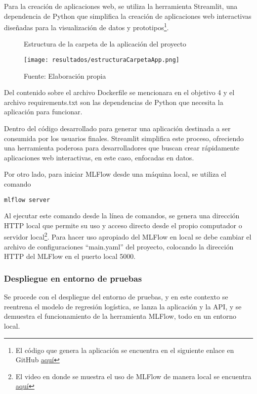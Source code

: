 Para la creación de aplicaciones web, se utiliza la herramienta Streamlit, una dependencia de Python que simplifica la creación de aplicaciones web interactivas diseñadas para la visualización de datos y prototipos\footnote{El código que genera la aplicación se encuentra en el siguiente enlace en GitHub \href{https://github.com/juferoto/mlops_project/tree/master/application/src/webapp}{aquí}}.

\newpage

\begin{figure}[h]
\centering
\caption{Estructura de la carpeta de la aplicación del proyecto}
\texttt{[image: resultados/estructuraCarpetaApp.png]}
\caption*{\footnotesize Fuente: Elaboración propia}
\label{fig:figuraEstructuraCarpetaApp}
\end{figure}

Del contenido sobre el archivo Dockerfile se mencionara en el objetivo 4 y el archivo requirements.txt son las dependencias de Python que necesita la aplicación para funcionar.

Dentro del código desarrollado para generar una aplicación destinada a ser consumida por los usuarios finales. Streamlit simplifica este proceso, ofreciendo una herramienta poderosa para desarrolladores que buscan crear rápidamente aplicaciones web interactivas, en este caso, enfocadas en datos. \newline

Por otro lado, para iniciar MLFlow desde una máquina local, se utiliza el comando 
\begin{verbatim}
mlflow server
\end{verbatim}

Al ejecutar este comando desde la línea de comandos, se genera una dirección HTTP local que permite su uso y acceso directo desde el propio computador o servidor local\footnote{El video en donde se muestra el uso de MLFlow de manera local se encuentra \href{https://youtu.be/w4WX-OeOkrQ}{aquí}}.
Para hacer uso apropiado del MLFlow en local se debe cambiar el archivo de configuraciones ``main.yaml'' del proyecto, colocando la dirección HTTP del MLFlow en el puerto local 5000.

\newpage

\subsubsection{Despliegue en entorno de pruebas}

Se procede con el despliegue del entorno de pruebas, y en este contexto se reentrena el modelo de regresión logística, se lanza la aplicación y la API, y se demuestra el funcionamiento de la herramienta MLFlow, todo en un entorno local.

